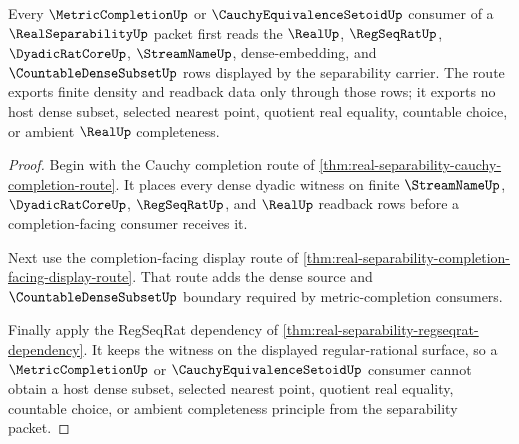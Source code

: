 \begin{theorem}
\label{thm:real-separability-forward-metric-completion-route}
Every $\MetricCompletionUp$ or $\CauchyEquivalenceSetoidUp$ consumer of a $\RealSeparabilityUp$ packet first reads the $\RealUp$, $\RegSeqRatUp$, $\DyadicRatCoreUp$, $\StreamNameUp$, dense-embedding, and $\CountableDenseSubsetUp$ rows displayed by the separability carrier. The route exports finite density and readback data only through those rows; it exports no host dense subset, selected nearest point, quotient real equality, countable choice, or ambient $\RealUp$ completeness.
\end{theorem}
\begin{proof}
Begin with the Cauchy completion route of \autoref{thm:real-separability-cauchy-completion-route}. It places every dense dyadic witness on finite $\StreamNameUp$, $\DyadicRatCoreUp$, $\RegSeqRatUp$, and $\RealUp$ readback rows before a completion-facing consumer receives it.

Next use the completion-facing display route of \autoref{thm:real-separability-completion-facing-display-route}. That route adds the dense source and $\CountableDenseSubsetUp$ boundary required by metric-completion consumers.

Finally apply the RegSeqRat dependency of \autoref{thm:real-separability-regseqrat-dependency}. It keeps the witness on the displayed regular-rational surface, so a $\MetricCompletionUp$ or $\CauchyEquivalenceSetoidUp$ consumer cannot obtain a host dense subset, selected nearest point, quotient real equality, countable choice, or ambient completeness principle from the separability packet.
\end{proof}
